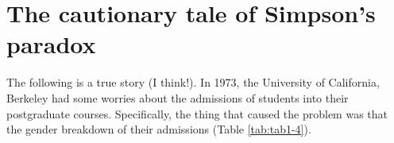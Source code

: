 \documentclass[
]{book}
\begin{document}
\hypertarget{the-cautionary-tale-of-simpsons-paradox}{%
\section{The cautionary tale of Simpson's paradox}\label{the-cautionary-tale-of-simpsons-paradox}}

The following is a true story (I think!). In 1973, the University of California, Berkeley had some worries about the admissions of students into their postgraduate courses. Specifically, the thing that caused the problem was that the gender breakdown of their admissions (Table \ref{tab:tab1-4}).

 
  \providecommand{\huxb}[2]{\arrayrulecolor[RGB]{#1}\global\arrayrulewidth=#2pt}
  \providecommand{\huxvb}[2]{\color[RGB]{#1}\vrule width #2pt}
  \providecommand{\huxtpad}[1]{\rule{0pt}{#1}}
  \providecommand{\huxbpad}[1]{\rule[-#1]{0pt}{#1}}
\end{document}
